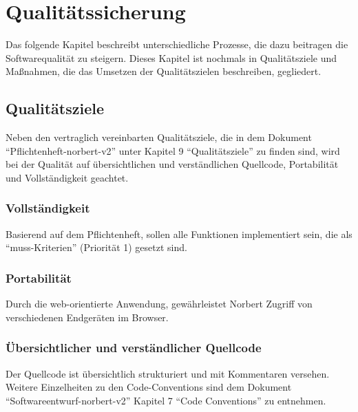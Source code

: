 
\chapter{Qualitätssicherung}
Das folgende Kapitel beschreibt unterschiedliche Prozesse, die dazu beitragen die Softwarequalität zu steigern. 
Dieses Kapitel ist nochmals in Qualitätsziele und Maßnahmen, die das Umsetzen der Qualitätszielen beschreiben, gegliedert.

\section{Qualitätsziele}
Neben den vertraglich vereinbarten Qualitätsziele, die in dem Dokument \enquote{Pflichtenheft-norbert-v2} unter Kapitel 9 \enquote{Qualitätsziele} zu finden sind, wird bei der Qualität auf übersichtlichen und verständlichen Quellcode, Portabilität und Vollständigkeit geachtet.

\subsection{Vollständigkeit}
Basierend auf dem Pflichtenheft, sollen alle Funktionen implementiert sein, die als \enquote{muss-Kriterien} (Priorität 1) gesetzt sind.

\subsection{Portabilität}
Durch die web-orientierte Anwendung, gewährleistet Norbert Zugriff von verschiedenen Endgeräten im Browser. 

\subsection{Übersichtlicher und verständlicher Quellcode}
Der Quellcode ist übersichtlich strukturiert und mit Kommentaren versehen. Weitere Einzelheiten zu den Code-Conventions sind dem Dokument \enquote{Softwareentwurf-norbert-v2} Kapitel 7 \enquote{Code Conventions} zu entnehmen.

\newpage
